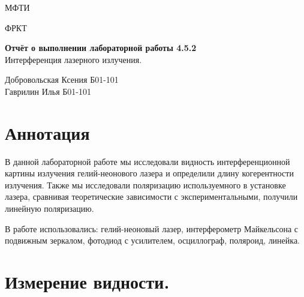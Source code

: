 \documentclass[a4paper,12pt]{article}
\date{\today}
\begin{document}
\begin{titlepage}
	\begin{center}
		{\large МФТИ}
	\end{center}
	\begin{center}
		{\large ФРКТ}
	\end{center}
	
	
	\vspace{4.5cm}
	{\huge
		\begin{center}
			{\bf Отчёт о выполнении лабораторной работы 4.5.2}\\
		  Интерференция лазерного излучения.
		

		\end{center}
	}
	\vspace{9cm}
	\begin{flushright}
		{\LARGE  Добровольская Ксения 
			\vspace{0.2cm}
			Б01-101}\\
		{\LARGE  Гаврилин Илья 
			\vspace{0.2cm}
			Б01-101}
	\end{flushright}
	\vspace{8cm}
	
\end{titlepage}

\section{Аннотация}

  В данной лабораторной работе мы исследовали видность интерференционной картины излучения гелий-неонового лазера и определили длину когерентности излучения. Также мы исследовали поляризацию используемного в установке лазера, сравнивая теоретические зависимости с экспериментальными, получили линейную поляризацию.
  
  
  В работе использовались: гелий-неоновый лазер, интерферометр Майкельсона с подвижным зеркалом, фотодиод с усилителем, осциллограф, поляроид, линейка.
  
\section{Измерение видности.} 
\end{document}
